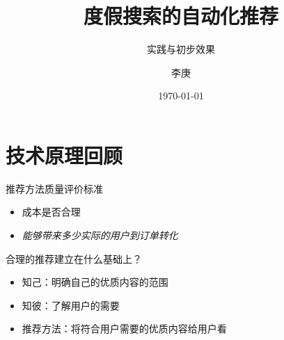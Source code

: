 \documentclass{beamer}
\begin{document}
\begin{CJK}{UTF8}{gbsn}

\title{度假搜索的自动化推荐}

\subtitle{实践与初步效果}

\author{李庚}


\date{\today}




\begin{frame}
  \titlepage
\end{frame}


\section{技术原理回顾}

\begin{frame}{推荐方法质量评价标准}
  \begin{itemize}
    \item {成本是否合理}
    \item {\emph{能够带来多少实际的用户到订单转化}}
  \end{itemize}
\end{frame}

\begin{frame}{合理的推荐建立在什么基础上？}
  \begin{itemize}
  \item {知己：明确自己的优质内容的范围}
  \item {知彼：了解用户的需要}
  \item {推荐方法：将符合用户需要的优质内容给用户看}
  \end{itemize}
\end{frame}


\end{CJK}
\end{document}
